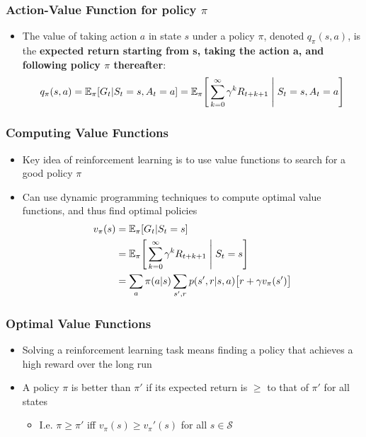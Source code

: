 \documentclass{beamer}
\begin{document}

\begin{frame}
\frametitle{Action-Value Function for policy $\pi$}
\begin{itemize}
\item The value of taking action $a$ in state $s$ under a policy $\pi$, denoted
$q_\pi(s,a)$, is the \textbf{expected return starting from s, taking the action a, and following policy $\pi$ thereafter}:
\begin{equation}
q_\pi(s,a) = \mathbb{E}_\pi[G_t | S_t = s, A_t = a] = \mathbb{E}_\pi\Bigg[\sum_{k=0}^{\infty} \gamma^k R_{t+k+1} \Biggm\lvert S_t = s, A_t = a \Bigg]
\nonumber
\end{equation}
\end{itemize}
\end{frame}



\begin{frame}
\frametitle{Computing Value Functions}
\begin{itemize}
\item Key idea of reinforcement learning is to use value functions to search for a good policy $\pi$
\item Can use dynamic programming techniques to compute optimal value functions, and thus find optimal policies 
\begin{align*}
v_\pi(s) &= \mathbb{E}_\pi[G_t | S_t = s] \\
&= \mathbb{E}_\pi\Bigg[\sum_{k=0}^{\infty} \gamma^k R_{t+k+1} \Biggm\lvert S_t = s \Bigg] \\
&= \sum_{a}\pi(a|s) \sum_{s',r} p(s',r|s,a) \big[ r + \gamma v_\pi(s') \big]
\nonumber
\end{align*}
\end{itemize}
\end{frame}


\begin{frame}
\frametitle{Optimal Value Functions}
\begin{itemize}
\item Solving a reinforcement learning task means finding a policy that achieves a
high reward over the long run
\item A policy $\pi$ is better than $\pi'$ if its expected return is $\geq$ to that of $\pi'$ for all states
   \begin{itemize}
   	\item I.e. $\pi \geq \pi'$ iff $v_\pi(s) \geq v_\pi'(s)$ for all $s \in \mathscr{S}$
      \end{itemize}
\end{itemize}
\end{frame}
\end{document}
